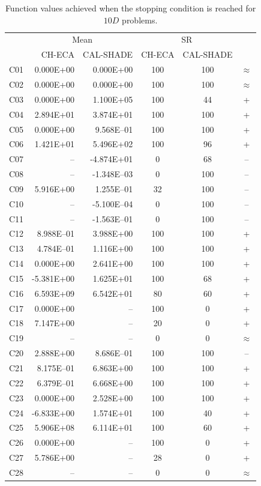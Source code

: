 \documentclass[conference]{IEEEtran}
\begin{document}
% 
% 
% 
\begin{table}[!ht]
	\caption{Function values achieved when the stopping condition is reached for $10D$ problems.}
	\centering
	\begin{tabular}{|c|r|r|c|c|c|}
	 \hline
	 &\multicolumn{2}{|c|}{Mean} & \multicolumn{2}{|c|}{SR} & \\
	\cline{2-5}
	    & CH-ECA & CAL-SHADE & CH-ECA & CAL-SHADE & \\ \hline
C01 & 0.000E+00 & 0.000E+00 &  100 &  100 & $\approx$ \\ 
C02 & 0.000E+00 & 0.000E+00 &  100 &  100 & $\approx$ \\ 
C03 & 0.000E+00 & 1.100E+05 &  100 &   44 & + \\ 
C04 & 2.894E+01 & 3.874E+01 &  100 &  100 & + \\ 
C05 & 0.000E+00 & 9.568E--01 &  100 &  100 & + \\ 
C06 & 1.421E+01 & 5.496E+02 &  100 &   96 & + \\ 
C07 &  -- & -4.874E+01 &    0 &   68 & -- \\ 
C08 &  -- & -1.348E--03 &    0 &  100 & -- \\ 
C09 & 5.916E+00 & 1.255E--01 &   32 &  100 & -- \\ 
C10 &  -- & -5.100E--04 &    0 &  100 & -- \\ 
C11 &  -- & -1.563E--01 &    0 &  100 & -- \\ 
C12 & 8.988E--01 & 3.988E+00 &  100 &  100 & + \\ 
C13 & 4.784E--01 & 1.116E+00 &  100 &  100 & + \\ 
C14 & 0.000E+00 & 2.641E+00 &  100 &  100 & + \\ 
C15 & -5.381E+00 & 1.625E+01 &  100 &   68 & + \\ 
C16 & 6.593E+09 & 6.542E+01 &   80 &   60 & + \\ 
C17 & 0.000E+00 &  -- &  100 &    0 & + \\ 
C18 & 7.147E+00 &  -- &   20 &    0 & + \\ 
C19 &  -- &  -- &    0 &    0 & $\approx$ \\ 
C20 & 2.888E+00 & 8.686E--01 &  100 &  100 & -- \\ 
C21 & 8.175E--01 & 6.863E+00 &  100 &  100 & + \\ 
C22 & 6.379E--01 & 6.668E+00 &  100 &  100 & + \\ 
C23 & 0.000E+00 & 2.528E+00 &  100 &  100 & + \\ 
C24 & -6.833E+00 & 1.574E+01 &  100 &   40 & + \\ 
C25 & 5.906E+08 & 6.114E+01 &  100 &   60 & + \\ 
C26 & 0.000E+00 &  -- &  100 &    0 & + \\ 
C27 & 5.786E+00 &  -- &   28 &    0 & + \\ 
C28 &  -- &  -- &    0 &    0 & $\approx$ \\ 
   \hline
	\end{tabular}
	\label{tab:d10c}
\end{table}
\end{document}
